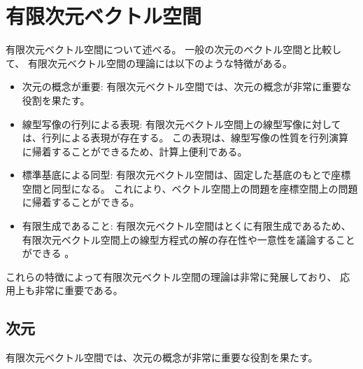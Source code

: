\documentclass[report]{jlreq}
\begin{document}
%
\chapter{有限次元ベクトル空間}

有限次元ベクトル空間について述べる。
一般の次元のベクトル空間と比較して、
有限次元ベクトル空間の理論には以下のような特徴がある。
\begin{itemize}
    \item 次元の概念が重要:
        有限次元ベクトル空間では、次元の概念が非常に重要な役割を果たす。
    \item 線型写像の行列による表現:
        有限次元ベクトル空間上の線型写像に対しては、行列による表現が存在する。
        この表現は、線型写像の性質を行列演算に帰着することができるため、計算上便利である。
    \item 標準基底による同型:
        有限次元ベクトル空間は、固定した基底のもとで座標空間と同型になる。
        これにより、ベクトル空間上の問題を座標空間上の問題に帰着することができる。
    \item 有限生成であること:
        有限次元ベクトル空間はとくに有限生成であるため、
        有限次元ベクトル空間上の線型方程式の解の存在性や一意性を議論することができる
        。
\end{itemize}

これらの特徴によって有限次元ベクトル空間の理論は非常に発展しており、
応用上も非常に重要である。

%
\section{次元}

有限次元ベクトル空間では、次元の概念が非常に重要な役割を果たす。

\end{document}
